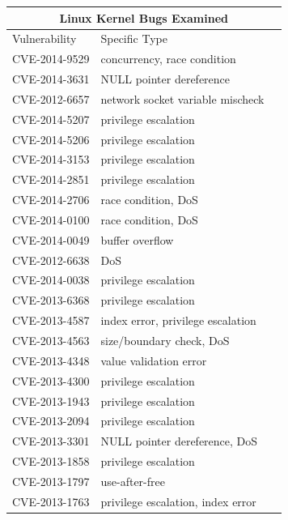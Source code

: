 \begin{table}[!ht]
\begin{tabular*}{\textwidth}{l @{\extracolsep{\fill}} lc}
\toprule
\multicolumn{3}{c}{Linux Kernel Bugs Examined} \\
\midrule
Vulnerability    &  Specific Type \\
\midrule
 CVE-2014-9529 \cite{CVE:20149529} & concurrency, race condition \\
 CVE-2014-3631 \cite{CVE:20143631} & NULL pointer dereference \\
 CVE-2012-6657 \cite{CVE:20126657} & network socket variable mischeck \\
 CVE-2014-5207 \cite{CVE:20145207} & privilege escalation \\
 CVE-2014-5206 \cite{CVE:20145206} & privilege escalation \\
 CVE-2014-3153 \cite{CVE:20143153} & privilege escalation \\
 CVE-2014-2851 \cite{CVE:20142851} & privilege escalation \\
 CVE-2014-2706 \cite{CVE:20142706} & race condition, DoS \\
 CVE-2014-0100 \cite{CVE:20140100} & race condition, DoS \\
 CVE-2014-0049 \cite{CVE:20140049} & buffer overflow \\
 CVE-2012-6638 \cite{CVE:20126638} & DoS \\
 CVE-2014-0038 \cite{CVE:20140038} & privilege escalation \\
 CVE-2013-6368 \cite{CVE:20136368} & privilege escalation  \\
 CVE-2013-4587 \cite{CVE:20134587} & index error, privilege escalation \\
 CVE-2013-4563 \cite{CVE:20134563} & size/boundary check, DoS \\
 CVE-2013-4348 \cite{CVE:20134348} & value validation error \\
 CVE-2013-4300 \cite{CVE:20134300} & privilege escalation  \\
 CVE-2013-1943 \cite{CVE:20131943} & privilege escalation \\
 CVE-2013-2094 \cite{CVE:20132094} & privilege escalation  \\
 CVE-2013-3301 \cite{CVE:20133301} & NULL pointer dereference, DoS \\
 CVE-2013-1858 \cite{CVE:20131858} & privilege escalation \\
 CVE-2013-1797 \cite{CVE:20131797} & use-after-free \\
 CVE-2013-1763 \cite{CVE:20131763} & privilege escalation, index error \\

\end{tabular*}
\end{table}
